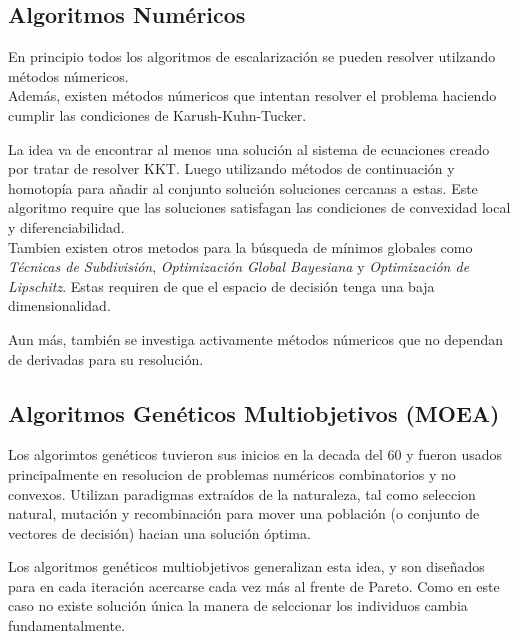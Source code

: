 \subsection{Algoritmos Num\'ericos}

En principio todos los algoritmos de escalarizaci\'on se pueden resolver utilzando m\'etodos n\'umericos.\\

Adem\'as, existen m\'etodos n\'umericos que intentan resolver el problema haciendo cumplir las condiciones de Karush-Kuhn-Tucker.

La idea va de encontrar al menos una soluci\'on al sistema de ecuaciones creado por tratar de resolver KKT. Luego utilizando m\'etodos de continuaci\'on y homotop\'ia para añadir al conjunto soluci\'on soluciones cercanas a estas. Este algoritmo require que las soluciones satisfagan las condiciones de convexidad local y diferenciabilidad.\\

Tambien existen otros metodos para la b\'usqueda de m\'inimos globales como \textit{T\'ecnicas de Subdivisi\'on}, \textit{Optimizaci\'on Global Bayesiana} y \textit{Optimizaci\'on de Lipschitz}. Estas requiren de que el espacio de decisi\'on tenga una baja dimensionalidad.

Aun m\'as, tambi\'en se investiga activamente m\'etodos n\'umericos que no dependan de derivadas para su resoluci\'on.

\subsection{Algoritmos Gen\'eticos Multiobjetivos (MOEA)}

Los algorimtos gen\'eticos tuvieron sus inicios en la decada del 60 y fueron usados principalmente en resolucion de problemas num\'ericos combinatorios y no convexos. Utilizan paradigmas extra\'idos de la naturaleza, tal como seleccion natural, mutaci\'on y recombinaci\'on para mover una poblaci\'on (o conjunto de vectores de decisi\'on) hacian una soluci\'on \'optima.

Los algoritmos gen\'eticos multiobjetivos generalizan esta idea, y son diseñados para en cada iteraci\'on acercarse cada vez m\'as al frente de Pareto. Como en este caso no existe soluci\'on \'unica la manera de selccionar los individuos cambia fundamentalmente.

